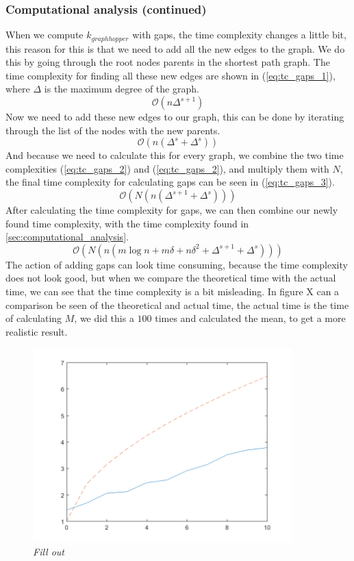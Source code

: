 \documentclass{article}
\begin{document}
\subsubsection{Computational analysis (continued)}
When we compute $k_{graphhopper}$ with gaps, the time complexity changes a little bit, this reason for this is that we need to add all the new edges to the graph. We do this by going through the root nodes parents in the shortest path graph. The time complexity for finding all these new edges are shown in (\ref{eq:tc_gaps_1}), where $\Delta$ is the maximum degree of the graph.
\begin{equation}
\label{eq:tc_gaps_1}
\mathcal{O}\left(n \Delta^{s + 1}\right)
\end{equation}
Now we need to add these new edges to our graph, this can be done by iterating through the list of the nodes with the new parents.
\begin{equation}
\label{eq:tc_gaps_2}
\mathcal{O}\left(n \left(\Delta^{s} + \Delta^{s}\right)\right)
\end{equation}
And because we need to calculate this for every graph, we combine the two time complexities (\ref{eq:tc_gaps_2}) and (\ref{eq:tc_gaps_2}), and multiply them with $N$, the final time complexity for calculating gaps can be seen in (\ref{eq:tc_gaps_3}).
\begin{equation}
\label{eq:tc_gaps_3}
\mathcal{O}\left(N\left(n\left(\Delta^{s + 1} + \Delta^{s}\right)\right)\right)
\end{equation}
After calculating the time complexity for gaps, we can then combine our newly found time complexity, with the time complexity found in \ref{sec:computational_analysis}.
\begin{equation}
\mathcal{O}\left(N\left(n\left(m\log n + m\delta + n\delta^2 + \Delta^{s + 1} + \Delta^{s}\right)\right)\right)
\end{equation}
The action of adding gaps can look time consuming, because the time complexity does not look good, but when we compare the theoretical time with the actual time, we can see that the time complexity is a bit misleading. In figure X can a comparison be seen of the theoretical and actual time, the actual time is the time of calculating $M$, we did this a $100$ times and calculated the mean, to get a more realistic result.
\begin{figure}[H]
	\centering
	\includegraphics[width=10cm]{time_complexity_gaps}
	\caption{\textit{Fill out}}
	\label{fig:time_complexity_gaps}
\end{figure}
\end{document}
